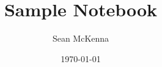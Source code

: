 \documentclass[11pt,a4paper]{scrreprt}
\begin{document}
\author{Sean McKenna} 
\title{Sample Notebook} 
\date{\today} 

\maketitle
\tableofcontents

% 




\end{document}
